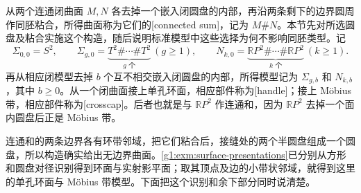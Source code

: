 \begin{definition}[连通和与标准模型]\label{g1:def:surface-standard-models}
	从两个连通闭曲面 \(M,N\) 各去掉一个嵌入闭圆盘的内部，再沿两条剩下的边界圆周作同胚粘合，所得曲面称为它们的[connected sum]，记为 \(M\#N\)。本节先对所选圆盘及粘合实施这个构造，随后说明标准模型中这些选择为何不影响同胚类型。记
	\[
		\Sigma_{0,0}=S^2,\qquad \Sigma_{g,0}=\underbrace{T^2\#\cdots\#T^2}_{g\text{ 个}}\ (g\ge1),\qquad N_{k,0}=\underbrace{\mathbb RP^2\#\cdots\#\mathbb RP^2}_{k\text{ 个}}\ (k\ge1).
	\]
	再从相应闭模型去掉 \(b\) 个互不相交嵌入闭圆盘的内部，所得模型记为 \(\Sigma_{g,b}\) 和 \(N_{k,b}\)，其中 \(b\ge0\)。从一个闭曲面接上单孔环面，相应部件称为[handle]；接上 Möbius 带，相应部件称为[crosscap]。后者也就是与 \(\mathbb RP^2\) 作连通和，因为 \(\mathbb RP^2\) 去掉一个面内圆盘后正是 Möbius 带。
\end{definition}

连通和的两条边界各有环带邻域，把它们粘合后，接缝处的两个半圆盘组成一个圆盘，所以构造确实给出无边界曲面。\cref{g1:exm:surface-presentations}已分别从方形和圆盘对径识别得到环面与实射影平面；取其顶点及边的小带状邻域，就得到这里的单孔环面与 Möbius 带模型。下面把这个识别和余下部分同时说清楚。

